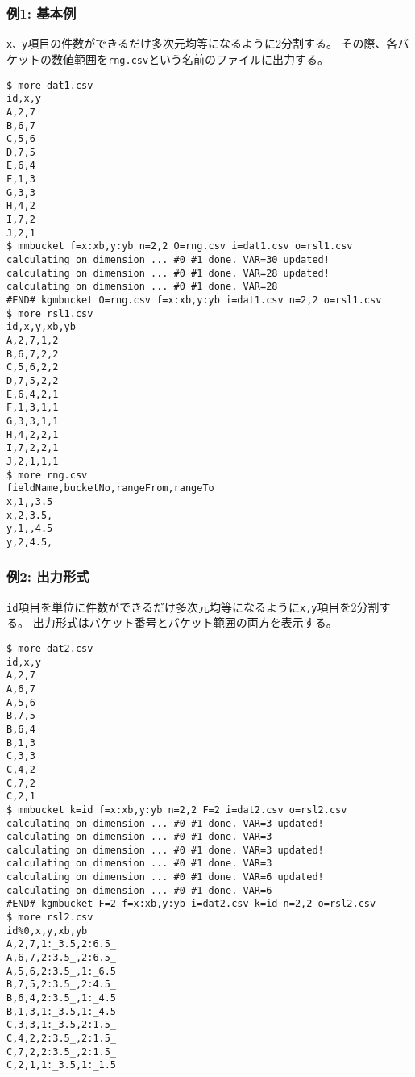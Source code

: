 \subsubsection*{例1: 基本例}

\verb|x、y|項目の件数ができるだけ多次元均等になるように2分割する。
その際、各バケットの数値範囲を\verb|rng.csv|という名前のファイルに出力する。


\begin{Verbatim}[baselinestretch=0.7,frame=single]
$ more dat1.csv
id,x,y
A,2,7
B,6,7
C,5,6
D,7,5
E,6,4
F,1,3
G,3,3
H,4,2
I,7,2
J,2,1
$ mmbucket f=x:xb,y:yb n=2,2 O=rng.csv i=dat1.csv o=rsl1.csv
calculating on dimension ... #0 #1 done. VAR=30 updated!
calculating on dimension ... #0 #1 done. VAR=28 updated!
calculating on dimension ... #0 #1 done. VAR=28
#END# kgmbucket O=rng.csv f=x:xb,y:yb i=dat1.csv n=2,2 o=rsl1.csv
$ more rsl1.csv
id,x,y,xb,yb
A,2,7,1,2
B,6,7,2,2
C,5,6,2,2
D,7,5,2,2
E,6,4,2,1
F,1,3,1,1
G,3,3,1,1
H,4,2,2,1
I,7,2,2,1
J,2,1,1,1
$ more rng.csv
fieldName,bucketNo,rangeFrom,rangeTo
x,1,,3.5
x,2,3.5,
y,1,,4.5
y,2,4.5,
\end{Verbatim}
\subsubsection*{例2: 出力形式}

\verb|id|項目を単位に件数ができるだけ多次元均等になるように\verb|x,y|項目を2分割する。
出力形式はバケット番号とバケット範囲の両方を表示する。


\begin{Verbatim}[baselinestretch=0.7,frame=single]
$ more dat2.csv
id,x,y
A,2,7
A,6,7
A,5,6
B,7,5
B,6,4
B,1,3
C,3,3
C,4,2
C,7,2
C,2,1
$ mmbucket k=id f=x:xb,y:yb n=2,2 F=2 i=dat2.csv o=rsl2.csv
calculating on dimension ... #0 #1 done. VAR=3 updated!
calculating on dimension ... #0 #1 done. VAR=3
calculating on dimension ... #0 #1 done. VAR=3 updated!
calculating on dimension ... #0 #1 done. VAR=3
calculating on dimension ... #0 #1 done. VAR=6 updated!
calculating on dimension ... #0 #1 done. VAR=6
#END# kgmbucket F=2 f=x:xb,y:yb i=dat2.csv k=id n=2,2 o=rsl2.csv
$ more rsl2.csv
id%0,x,y,xb,yb
A,2,7,1:_3.5,2:6.5_
A,6,7,2:3.5_,2:6.5_
A,5,6,2:3.5_,1:_6.5
B,7,5,2:3.5_,2:4.5_
B,6,4,2:3.5_,1:_4.5
B,1,3,1:_3.5,1:_4.5
C,3,3,1:_3.5,2:1.5_
C,4,2,2:3.5_,2:1.5_
C,7,2,2:3.5_,2:1.5_
C,2,1,1:_3.5,1:_1.5
\end{Verbatim}
